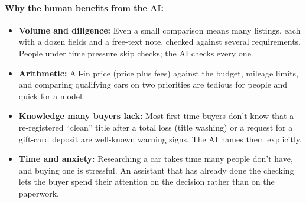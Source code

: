 \documentclass[11pt]{article}
\begin{document}
\paragraph{Why the human benefits from the AI:}
\begin{itemize}
  \item \textbf{Volume and diligence:} Even a small comparison means many listings, each with a
  dozen fields and a free-text note, checked against several requirements. People under time
  pressure skip checks; the AI checks every one.
  \item \textbf{Arithmetic:} All-in price (price plus fees) against the budget, mileage limits, and
  comparing qualifying cars on two priorities are tedious for people and quick for a model.
  \item \textbf{Knowledge many buyers lack:} Most first-time buyers don't know that a re-registered
  ``clean'' title after a total loss (title washing) or a request for a gift-card deposit are
  well-known warning signs. The AI names them explicitly.
  \item \textbf{Time and anxiety:} Researching a car takes time many people don't have, and buying
  one is stressful. An assistant that has already done the checking lets the buyer spend their
  attention on the decision rather than on the paperwork.
\end{itemize}
\end{document}
